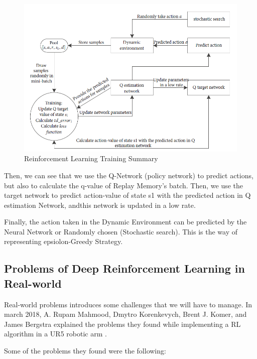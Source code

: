 			\begin{figure}
				\centering
				\includegraphics[width=0.7\linewidth]{Images/Training}
				\caption[RL Training]{Reinforcement Learning Training Summary}
				\label{fig:training}
			\end{figure}
		
			Then, we can see that we use the Q-Network (policy network) to predict actions, but also to calculate the q-value of Replay Memory's batch. Then, we use the target network to predict action-value of state s1 with the predicted action in Q estimation Network, andthis network is updated in a low rate.
			
			Finally, the action taken in the Dynamic Environment can be predicted by the Neural Network or Randomly chosen (Stochastic search). This is the way of representing epsiolon-Greedy Strategy. 
				
			
		
		
	\subsection{Problems of Deep Reinforcement Learning in Real-world}
		
		Real-world problems introduces some challenges that we will have to manage. In march 2018, A. Rupam Mahmood, Dmytro Korenkevych, Brent J. Komer, and James Bergstra explained the problems they found while implementing a RL algorithm in a UR5 robotic arm \cite{mahmood_setting_2018}.
		
		Some of the problems they found were the following:
		
